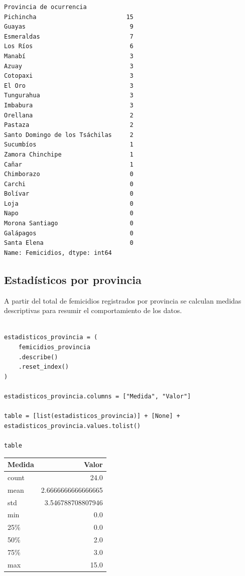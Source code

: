 \documentclass[11pt]{article}
\begin{document}
\begin{verbatim}
Provincia de ocurrencia
Pichincha                         15
Guayas                             9
Esmeraldas                         7
Los Ríos                           6
Manabí                             3
Azuay                              3
Cotopaxi                           3
El Oro                             3
Tungurahua                         3
Imbabura                           3
Orellana                           2
Pastaza                            2
Santo Domingo de los Tsáchilas     2
Sucumbíos                          1
Zamora Chinchipe                   1
Cañar                              1
Chimborazo                         0
Carchi                             0
Bolívar                            0
Loja                               0
Napo                               0
Morona Santiago                    0
Galápagos                          0
Santa Elena                        0
Name: Femicidios, dtype: int64
\end{verbatim}


\subsection{Estadísticos por provincia}
\label{sec:org9ea8dc3}

A partir del total de femicidios registrados por provincia se calculan
medidas descriptivas para resumir el comportamiento de los datos.

\begin{verbatim}

estadisticos_provincia = (
    femicidios_provincia
    .describe()
    .reset_index()
)

estadisticos_provincia.columns = ["Medida", "Valor"]

table = [list(estadisticos_provincia)] + [None] + estadisticos_provincia.values.tolist()

table

\end{verbatim}

\begin{center}
\begin{tabular}{lr}
Medida & Valor\\[0pt]
\hline
count & 24.0\\[0pt]
mean & 2.6666666666666665\\[0pt]
std & 3.546788708807946\\[0pt]
min & 0.0\\[0pt]
25\% & 0.0\\[0pt]
50\% & 2.0\\[0pt]
75\% & 3.0\\[0pt]
max & 15.0\\[0pt]
\end{tabular}
\end{center}
\end{document}
